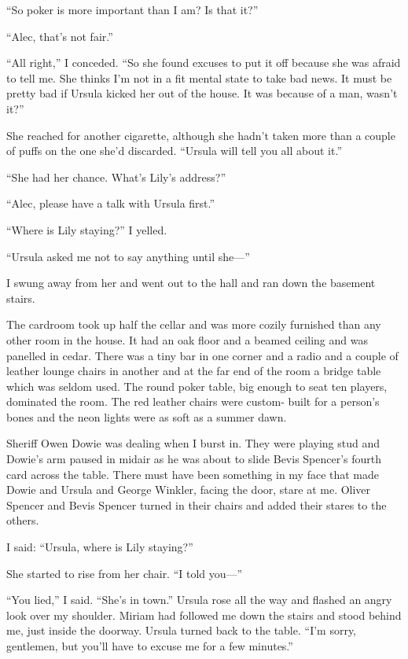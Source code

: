 \documentclass{novel}
\begin{document}
“So poker is more important than I am? Is that it?”

“Alec, that’s not fair.”

“All right,” I conceded. “So she found excuses to put it off because she was afraid to tell me. She thinks I’m not in a fit mental state to take bad news. It must be pretty bad if Ursula kicked her out of the house. It was because of a man, wasn’t it?”

She reached for another cigarette, although she hadn’t taken more than a couple of puffs on the one she’d discarded. “Ursula will tell you all about it.”

“She had her chance. What’s Lily’s address?”

“Alec, please have a talk with Ursula first.”

“Where is Lily staying?” I yelled.

“Ursula asked me not to say anything until she—”

I swung away from her and went out to the hall and ran down the basement stairs.

The cardroom took up half the cellar and was more cozily furnished than any other room in the house. It had an oak floor and a beamed ceiling and was panelled in cedar. There was a tiny bar in one corner and a radio and a couple of leather lounge chairs in another and at the far end of the room a bridge table which was seldom used. The round poker table, big enough to seat ten players, dominated the room. The red leather chairs were custom- built for a person’s bones and the neon lights were as soft as a summer dawn.

Sheriff Owen Dowie was dealing when I burst in. They were playing stud and Dowie’s arm paused in midair as he was about to slide Bevis Spencer’s fourth card across the table. There must have been something in my face that made Dowie and Ursula and George Winkler, facing the door, stare at me. Oliver Spencer and Bevis Spencer turned in their chairs and added their stares to the others.

I said: “Ursula, where is Lily staying?”

She started to rise from her chair. “I told you—”

“You lied,” I said. “She’s in town.” Ursula rose all the way and flashed an angry look over my shoulder. Miriam had followed me down the stairs and stood behind me, just inside the doorway. Ursula turned back to the table. “I’m sorry, gentlemen, but you’ll have to excuse me for a few minutes.”
\end{document}

